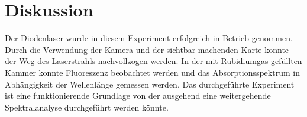 
\section{Diskussion}
Der Diodenlaser wurde in diesem Experiment erfolgreich in Betrieb genommen.
Durch die Verwendung der Kamera und der sichtbar machenden Karte konnte der Weg des Laserstrahls nachvollzogen werden.
In der mit Rubidiumgas gefüllten Kammer konnte Fluoreszenz beobachtet werden und das Absorptionsspektrum in Abhängigkeit
der Wellenlänge gemessen werden.
Das durchgeführte Experiment ist eine funktionierende Grundlage von der ausgehend
 eine weitergehende Spektralanalyse durchgeführt werden könnte. 



\printbibliography


